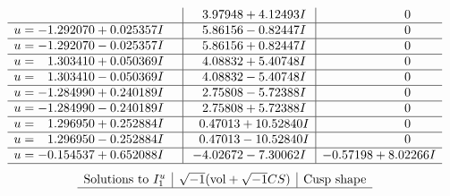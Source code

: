 \documentclass[1p]{elsarticle_modified}
\theoremstyle{definition}
\newcommand{\I}{\sqrt{-1}}
\begin{document}
$$\begin{array}{c|c|c}
 & \phantom{-}3.97948 + 4.12493 I & \phantom{-0.000000 } 0 \\ \hline\begin{aligned}
u &= -1.292070 + 0.025357 I\end{aligned}
 & \phantom{-}5.86156 - 0.82447 I & \phantom{-0.000000 } 0 \\ \hline\begin{aligned}
u &= -1.292070 - 0.025357 I\end{aligned}
 & \phantom{-}5.86156 + 0.82447 I & \phantom{-0.000000 } 0 \\ \hline\begin{aligned}
u &= \phantom{-}1.303410 + 0.050369 I\end{aligned}
 & \phantom{-}4.08832 + 5.40748 I & \phantom{-0.000000 } 0 \\ \hline\begin{aligned}
u &= \phantom{-}1.303410 - 0.050369 I\end{aligned}
 & \phantom{-}4.08832 - 5.40748 I & \phantom{-0.000000 } 0 \\ \hline\begin{aligned}
u &= -1.284990 + 0.240189 I\end{aligned}
 & \phantom{-}2.75808 - 5.72388 I & \phantom{-0.000000 } 0 \\ \hline\begin{aligned}
u &= -1.284990 - 0.240189 I\end{aligned}
 & \phantom{-}2.75808 + 5.72388 I & \phantom{-0.000000 } 0 \\ \hline\begin{aligned}
u &= \phantom{-}1.296950 + 0.252884 I\end{aligned}
 & \phantom{-}0.47013 + 10.52840 I & \phantom{-0.000000 } 0 \\ \hline\begin{aligned}
u &= \phantom{-}1.296950 - 0.252884 I\end{aligned}
 & \phantom{-}0.47013 - 10.52840 I & \phantom{-0.000000 } 0 \\ \hline\begin{aligned}
u &= -0.154537 + 0.652088 I\end{aligned}
 & -4.02672 - 7.30062 I & -0.57198 + 8.02266 I\\
 \hline 
 \end{array}$$\newpage$$\begin{array}{c|c|c}  
\text{Solutions to }I^u_{1}& \I (\text{vol} + \sqrt{-1}CS) & \text{Cusp shape}\\
 \hline 

\end{array}$$
\end{document}

